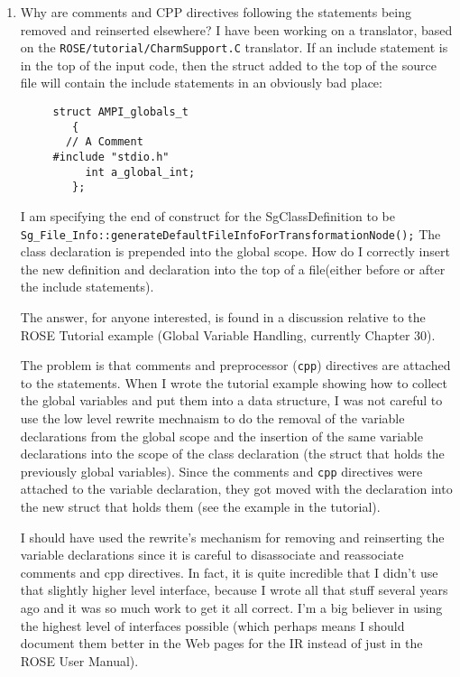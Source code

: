 \begin{enumerate}
\item Why are comments and CPP directives following the statements being 
      removed and reinserted elsewhere?
      I have been working on a translator, based on the 
      {\tt ROSE/tutorial/CharmSupport.C} translator. If an include statement is in the 
      top of the input code, then the struct added to the top of the source 
      file will contain the include statements in an obviously bad place:
{\indent
{\mySmallFontSize
\begin{verbatim}
     struct AMPI_globals_t
        {
       // A Comment
     #include "stdio.h"
          int a_global_int;
        };
\end{verbatim}
}}
   I am specifying the end of construct for the SgClassDefinition to be 
{\tt Sg\_File\_Info::generateDefaultFileInfoForTransformationNode();} The class 
declaration is prepended into the global scope. How do I correctly 
insert the new definition and declaration into the top of a file(either 
before or after the include statements).


The answer, for anyone interested, is found in a discussion relative to the ROSE Tutorial
example (Global Variable Handling, currently Chapter 30).  

The problem is that comments and preprocessor ({\tt cpp}) directives
are attached to the statements. When I wrote the tutorial example
showing how to collect the global variables and put them into a 
data structure, I was not careful to use the low level rewrite mechnaism
to do the removal of the variable declarations from the global scope
and the insertion of the same variable declarations into the scope of
the class declaration (the struct that holds the previously global 
variables).  Since the comments and {\tt cpp} directives were attached to
the variable declaration, they got moved with the declaration into the 
new struct that holds them (see the example in the tutorial).

   I should have used the rewrite's mechanism for removing and
reinserting the variable declarations since it is careful to 
disassociate and reassociate comments and cpp directives.
In fact, it is quite incredible that I didn't use that 
slightly higher level interface, because I wrote all that stuff
several years ago and it was so much work to get it all correct.
I'm a big believer in using the highest level of interfaces
possible (which perhaps means I should document them better 
in the Web pages for the IR instead of just in the ROSE User Manual).


\end{enumerate}
